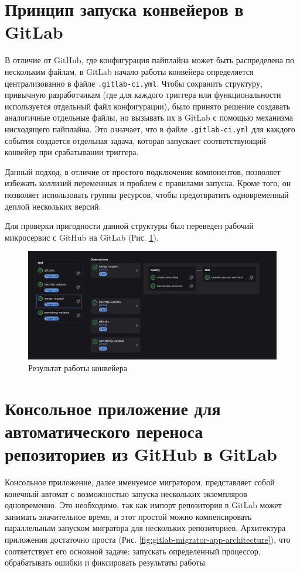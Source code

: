\section{Принцип запуска конвейеров в GitLab} \label{sec:pipeline-run-principal}
В отличие от GitHub, где конфигурация пайплайна может быть распределена по нескольким файлам,
в GitLab начало работы конвейера определяется централизованно в файле \texttt{.gitlab-ci.yml}.
Чтобы сохранить структуру, привычную разработчикам (где для каждого триггера или функциональности используется отдельный файл конфигурации),
было принято решение создавать аналогичные отдельные файлы,
но вызывать их в GitLab с помощью механизма нисходящего пайплайна.
Это означает, что в файле \texttt{.gitlab-ci.yml} для каждого события создается отдельная задача,
которая запускает соответствующий конвейер при срабатывании триггера.

Данный подход, в отличие от простого подключения компонентов, позволяет избежать коллизий переменных и проблем с правилами запуска.
Кроме того, он позволяет использовать группы ресурсов, чтобы предотвратить одновременный деплой нескольких версий.

Для проверки пригодности данной структуры был переведен рабочий микросервис с GitHub на GitLab (Рис. \ref{fig:pipeline-run-result}).

\begin{figure}[H]
  \centering
  \includegraphics[width=16cm]{img/pipeline-run-result}
  \caption{Результат работы конвейера}
  \label{fig:pipeline-run-result}
\end{figure}

\section{Консольное приложение для автоматического переноса репозиториев из GitHub в GitLab} \label{sec:gitlab-migrator-app}
Консольное приложение, далее именуемое мигратором, представляет собой конечный автомат\cite{fsm} с возможностью запуска нескольких экземпляров одновременно.
Это необходимо, так как импорт репозитория в GitLab может занимать значительное время, и этот простой можно компенсировать параллельным запуском мигратора для нескольких репозиториев.
Архитектура приложения достаточно проста (Рис. \ref{fig:gitlab-migrator-app-architecture}), что соответствует его основной задаче: запускать определенный процессор, обрабатывать ошибки и фиксировать результаты работы.


